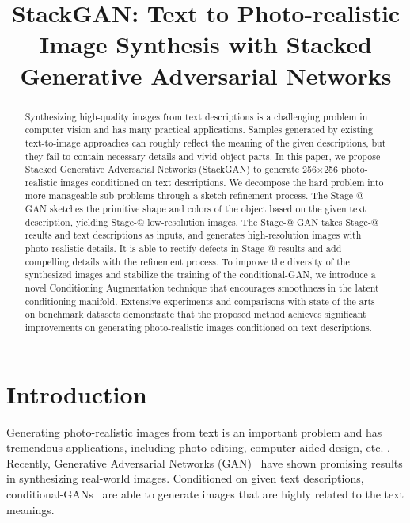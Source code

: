 \title{StackGAN: Text to Photo-realistic Image Synthesis with Stacked Generative Adversarial Networks}

\begin{abstract}
Synthesizing high-quality images from text descriptions is a challenging problem in computer vision and has many practical applications. Samples generated by existing text-to-image approaches can roughly reflect the meaning of the given descriptions, but they fail to contain necessary details and vivid object parts. In this paper, we propose Stacked Generative Adversarial Networks (StackGAN) to generate 256$\times$256 photo-realistic images conditioned on text descriptions. We decompose the hard problem into more manageable sub-problems through a sketch-refinement process. The Stage-\expandafter\@slowromancap{}@ GAN sketches the primitive shape and colors of the object based on the given text description, yielding Stage-\expandafter\@slowromancap{}@ low-resolution images. The Stage-\expandafter\@slowromancap{}@ GAN takes Stage-\expandafter\@slowromancap{}@ results and text descriptions as inputs, and generates high-resolution images with photo-realistic details. It is able to rectify defects in Stage-\expandafter\@slowromancap{}@ results and add compelling details with the refinement process. To improve the diversity of the synthesized images and stabilize the training of the conditional-GAN, we introduce a novel Conditioning Augmentation technique that encourages smoothness in the latent conditioning manifold. Extensive experiments and comparisons with state-of-the-arts on benchmark datasets demonstrate that the proposed method achieves significant improvements on generating photo-realistic images conditioned on text descriptions.
\end{abstract}

\section{Introduction}

Generating photo-realistic images from text is an important problem and has tremendous applications, including photo-editing, computer-aided design, etc. . Recently, Generative Adversarial Networks (GAN)~\cite{goodfellow2014generative, DentonCSF15, Radford15} have shown promising results in synthesizing real-world images. Conditioned on given text descriptions, conditional-GANs~\cite{reed2016generative, reed2016learning} are able to generate images that are highly related to the text meanings.

